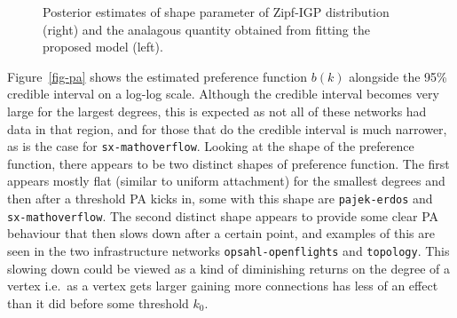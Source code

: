 \documentclass[
  sn-basic,
]{sn-jnl}
\theoremstyle{plain}
\theoremstyle{plain}
\theoremstyle{remark}
\begin{document}
\begin{figure}


\caption{\label{fig-shapes}Posterior estimates of shape parameter of
Zipf-IGP distribution (right) and the analagous quantity obtained from
fitting the proposed model (left).}

\end{figure}%

Figure~\ref{fig-pa} shows the estimated preference function \(b(k)\)
alongside the 95\% credible interval on a log-log scale. Although the
credible interval becomes very large for the largest degrees, this is
expected as not all of these networks had data in that region, and for
those that do the credible interval is much narrower, as is the case for
\texttt{sx-mathoverflow}. Looking at the shape of the preference
function, there appears to be two distinct shapes of preference
function. The first appears mostly flat (similar to uniform attachment)
for the smallest degrees and then after a threshold PA kicks in, some
with this shape are \texttt{pajek-erdos} and \texttt{sx-mathoverflow}.
The second distinct shape appears to provide some clear PA behaviour
that then slows down after a certain point, and examples of this are
seen in the two infrastructure networks \texttt{opsahl-openflights} and
\texttt{topology}. This slowing down could be viewed as a kind of
diminishing returns on the degree of a vertex i.e.~as a vertex gets
larger gaining more connections has less of an effect than it did before
some threshold \(k_0\).
\end{document}
